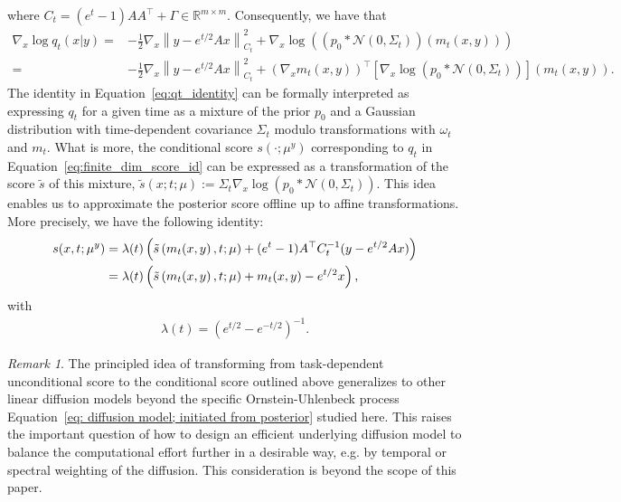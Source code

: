 \documentclass[10pt]{article} %
\def\Eqref#1{Equation~\ref{#1}}
\newcommand{\R}{\mathbb{R}}
\theoremstyle{plain}
\theoremstyle{definition}
\theoremstyle{remark}
\newtheorem{remark}[theorem]{Remark}
\newcommand{\norm}[1]{\left\|#1\right\|}
\newcommand{\N}{\mathcal N}
\begin{document}
where $C_t = (e^t - 1) A A^\top + \Gamma\in \R^{m\times m}$. Consequently, we have that 
\begin{equation}
    \begin{aligned}
        \label{eq:finite_dim_score_id}
    \nabla_x \log q_t(x|y) 
    =& -\frac12 \nabla_x \norm{y-e^{t/2} Ax}_{C_t}^2  + \nabla_x \log \left((p_0 \ast \N(0,\Sigma_t))(m_t(x,y))\right) \\
    = & - \frac12\nabla_x \norm{y-e^{t/2} Ax}_{C_t}^2 + (\nabla_x m_t(x,y))^\top  \left[\nabla_x \log \left(p_0 \ast \N(0,\Sigma_t)\right)\right](m_t(x,y)).
    \end{aligned}
\end{equation}
The identity in \Eqref{eq:qt_identity} can be formally interpreted as expressing $q_t$ for a given time %
as a mixture of the prior $p_0$ and a Gaussian distribution with time-dependent covariance $\Sigma_t$ modulo transformations with $\omega_t$ and $m_t$. What is more, the conditional score $s(\cdot; \mu^y)$ corresponding to $q_t$ in \Eqref{eq:finite_dim_score_id} can be expressed as a transformation of the score $\tilde s$ of this mixture, $\tilde s(x; t; \mu) :=\Sigma_t\nabla_x \log \left(p_0 \ast \N(0,\Sigma_t)\right)$. This idea enables us to approximate the posterior score offline up to affine transformations. More precisely, we have the following identity:
\begin{equation}\label{eq:finite_dim_score_id 2}
\begin{aligned}
     s(x, t; \mu^y) &= \lambda(t) \left(  \Tilde{s}\left(m_t(x, y\right), t; \mu) + (e^t-1) A^\top C_t^{-1}(y-e^{t/2}Ax)\right) \\
    & =\lambda(t) \left(  \Tilde{s}\left(m_t(x, y\right), t; \mu) + m_t(x, y) - e^{t/2}x \right),
\end{aligned}
\end{equation}
with
\begin{eqnarray*}
   \lambda(t) =  (e^{t/2} - e^{-t/2})^{-1}.
\end{eqnarray*}


\begin{remark}
The principled idea of transforming from task-dependent unconditional score to the conditional score outlined above generalizes to other linear diffusion models beyond the specific Ornstein-Uhlenbeck process \Eqref{eq: diffusion model; initiated from posterior} studied here. This raises the important question of how to design an efficient underlying diffusion model to balance the computational effort further in a desirable way, e.g. by temporal or spectral weighting of the diffusion. This consideration is beyond the scope of this paper.
\end{remark}
\end{document}
